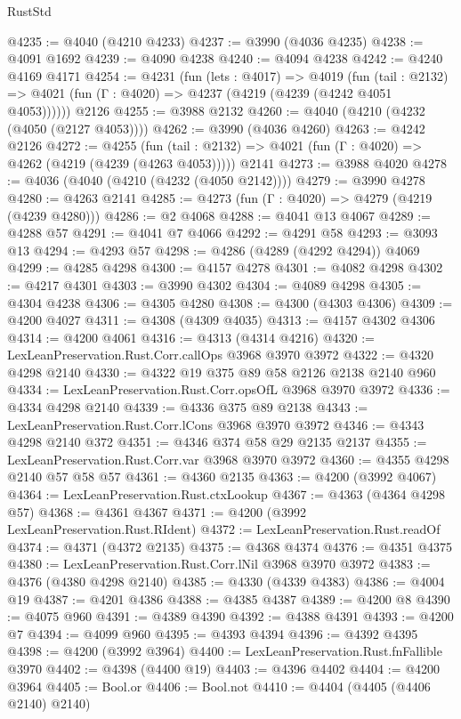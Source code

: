 \begin{lexlean}{RustStd}
\begin{coremodule}
{\begin{coremodule}
{{{{{{{{{{{{{{{{@4235 := @4040 (@4210 @4233)
@4237 := @3990 (@4036 @4235)
@4238 := @4091 @1692
@4239 := @4090 @4238
@4240 := @4094 @4238
@4242 := @4240 @4169 @4171
@4254 := @4231
    (fun (lets : @4017) =>
    @4019
      (fun (tail : @2132) => @4021 (fun (Γ : @4020) => @4237 (@4219 (@4239 (@4242 @4051 @4053))))))
    @2126
@4255 := @3988 @2132
@4260 := @4040 (@4210 (@4232 (@4050 (@2127 @4053))))
@4262 := @3990 (@4036 @4260)
@4263 := @4242 @2126
@4272 := @4255
    (fun (tail : @2132) => @4021 (fun (Γ : @4020) => @4262 (@4219 (@4239 (@4263 @4053)))))
    @2141
@4273 := @3988 @4020
@4278 := @4036 (@4040 (@4210 (@4232 (@4050 @2142))))
@4279 := @3990 @4278
@4280 := @4263 @2141
@4285 := @4273 (fun (Γ : @4020) => @4279 (@4219 (@4239 @4280)))
@4286 := @2 @4068
@4288 := @4041 @13 @4067
@4289 := @4288 @57
@4291 := @4041 @7 @4066
@4292 := @4291 @58
@4293 := @3093 @13
@4294 := @4293 @57
@4298 := @4286 (@4289 (@4292 @4294)) @4069
@4299 := @4285 @4298
@4300 := @4157 @4278
@4301 := @4082 @4298
@4302 := @4217 @4301
@4303 := @3990 @4302
@4304 := @4089 @4298
@4305 := @4304 @4238
@4306 := @4305 @4280
@4308 := @4300 (@4303 @4306)
@4309 := @4200 @4027
@4311 := @4308 (@4309 @4035)
@4313 := @4157 @4302 @4306
@4314 := @4200 @4061
@4316 := @4313 (@4314 @4216)
@4320 := LexLeanPreservation.Rust.Corr.callOps @3968 @3970 @3972
@4322 := @4320 @4298 @2140
@4330 := @4322 @19 @375 @89 @58 @2126 @2138 @2140 @960
@4334 := LexLeanPreservation.Rust.Corr.opsOfL @3968 @3970 @3972
@4336 := @4334 @4298 @2140
@4339 := @4336 @375 @89 @2138
@4343 := LexLeanPreservation.Rust.Corr.lCons @3968 @3970 @3972
@4346 := @4343 @4298 @2140 @372
@4351 := @4346 @374 @58 @29 @2135 @2137
@4355 := LexLeanPreservation.Rust.Corr.var @3968 @3970 @3972
@4360 := @4355 @4298 @2140 @57 @58 @57
@4361 := @4360 @2135
@4363 := @4200 (@3992 @4067)
@4364 := LexLeanPreservation.Rust.ctxLookup
@4367 := @4363 (@4364 @4298 @57)
@4368 := @4361 @4367
@4371 := @4200 (@3992 LexLeanPreservation.Rust.RIdent)
@4372 := LexLeanPreservation.Rust.readOf
@4374 := @4371 (@4372 @2135)
@4375 := @4368 @4374
@4376 := @4351 @4375
@4380 := LexLeanPreservation.Rust.Corr.lNil @3968 @3970 @3972
@4383 := @4376 (@4380 @4298 @2140)
@4385 := @4330 (@4339 @4383)
@4386 := @4004 @19
@4387 := @4201 @4386
@4388 := @4385 @4387
@4389 := @4200 @8
@4390 := @4075 @960
@4391 := @4389 @4390
@4392 := @4388 @4391
@4393 := @4200 @7
@4394 := @4099 @960
@4395 := @4393 @4394
@4396 := @4392 @4395
@4398 := @4200 (@3992 @3964)
@4400 := LexLeanPreservation.Rust.fnFallible @3970
@4402 := @4398 (@4400 @19)
@4403 := @4396 @4402
@4404 := @4200 @3964
@4405 := Bool.or
@4406 := Bool.not
@4410 := @4404 (@4405 (@4406 @2140) @2140)
}}}}}}}}}}}}}}}}
\end{coremodule}}
\end{coremodule}
\end{lexlean}
